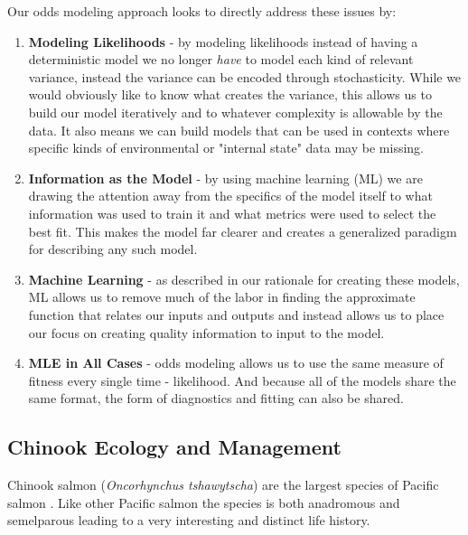 \documentclass[11pt]{article}
\begin{document}
Our odds modeling approach looks to directly address these issues by:

\begin{enumerate}
\item \textbf{Modeling Likelihoods} - by modeling likelihoods instead of having a deterministic model we no longer \textit{have} to model each kind of relevant variance, instead the variance can be encoded through stochasticity. While we would obviously like to know what creates the variance, this allows us to build our model iteratively and to whatever complexity is allowable by the data. It also means we can build models that can be used in contexts where specific kinds of environmental or "internal state" data may be missing.
\item \textbf{Information as the Model} - by using machine learning (ML) we are drawing the attention away from the specifics of the model itself to what information was used to train it and what metrics were used to select the best fit. This makes the model far clearer and creates a generalized paradigm for describing any such model.
\item \textbf{Machine Learning} - as described in our rationale for creating these models, ML allows us to remove much of the labor in finding the approximate function that relates our inputs and outputs and instead allows us to place our focus on creating quality information to input to the model.
\item \textbf{MLE in All Cases} - odds modeling allows us to use the same measure of fitness every single time - likelihood. And because all of the models share the same format, the form of diagnostics and fitting can also be shared.
\end{enumerate}



\newpage











\subsection{Chinook Ecology and Management}


Chinook salmon (\textit{Oncorhynchus tshawytscha}) are the largest species of Pacific salmon \cite{oceanchinook}. Like other Pacific salmon the species is both anadromous and semelparous leading to a very interesting and distinct life history. 
\end{document}
